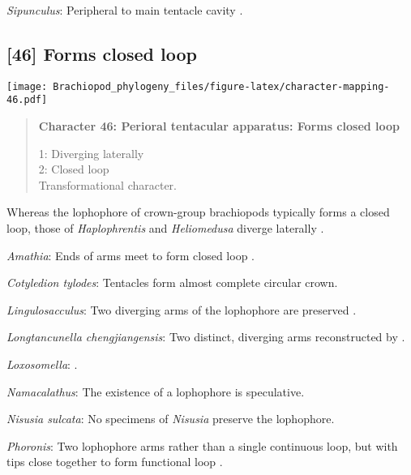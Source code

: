 \documentclass[openany]{book}
\theoremstyle{definition}
\theoremstyle{definition}
\theoremstyle{definition}
\theoremstyle{remark}
\begin{document}
\hypertarget{Sipunculus-coding-45}{}
\emph{Sipunculus}: Peripheral to main tentacle cavity
\citep{Pilger1982}.

\subsection*{{[}46{]} Forms closed loop}\label{forms-closed-loop}

\texttt{[image: Brachiopod\_phylogeny\_files/figure-latex/character-mapping-46.pdf]}

\begin{quote}
\textbf{Character 46: Perioral tentacular apparatus: Forms closed loop}

1: Diverging laterally\\
2: Closed loop\\
Transformational character.
\end{quote}

Whereas the lophophore of crown-group brachiopods typically forms a
closed loop, those of \emph{Haplophrentis} and \emph{Heliomedusa}
diverge laterally \citep{Moysiuk2017Hyolithsare}.

\hypertarget{Amathia-coding-46}{}
\emph{Amathia}: Ends of arms meet to form closed loop
\citep{Temereva2016Thenervous}.

\hypertarget{Cotyledion_tylodes-coding-46}{}
\emph{Cotyledion tylodes}: Tentacles form almost complete circular
crown.

\hypertarget{Lingulosacculus-coding-46}{}
\emph{Lingulosacculus}: Two diverging arms of the lophophore are
preserved \citep{Balthasar2009EarlyCambrian}.

\hypertarget{Longtancunella_chengjiangensis-coding-46}{}
\emph{Longtancunella chengjiangensis}: Two distinct, diverging arms
reconstructed by \citet{Zhang2007Agregarious}.

\hypertarget{Loxosomella-coding-46}{}
\emph{Loxosomella}: \citet{Nielsen1966}.

\hypertarget{Namacalathus-coding-46}{}
\emph{Namacalathus}: The existence of a lophophore is speculative.

\hypertarget{Nisusia_sulcata-coding-46}{}
\emph{Nisusia sulcata}: No specimens of \emph{Nisusia} preserve the
lophophore.

\hypertarget{Phoronis-coding-46}{}
\emph{Phoronis}: Two lophophore arms rather than a single continuous
loop, but with tips close together to form functional loop
\citep{Torrey1901}.
\end{document}
